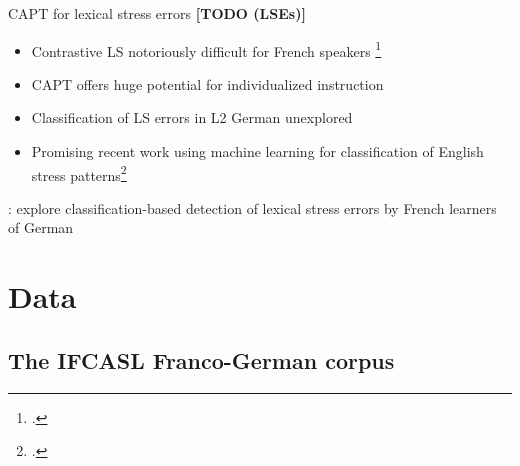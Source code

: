 \documentclass[xcolor={dvipsnames}]{beamer}
\newcommand{\TODO}[1]{{\color{red}\textbf{[TODO #1]}}}
\begin{document}
\begin{frame}{CAPT for lexical stress errors \TODO{(LSEs)}}
\begin{itemize}
\item{Contrastive LS notoriously difficult for French speakers%
\footcite{Dupoux1997}
}
\item{CAPT offers huge potential for individualized instruction}
\vfill
\item{Classification of LS errors in L2 German unexplored}
\item{Promising recent work using machine learning for classification of English stress patterns\footcite{Kim2011,Shahin2012a}
}
\end{itemize}
\vfill
{}: explore classification-based detection of lexical stress errors by French learners of German
\end{frame}


\section{Data}
\subsection{The IFCASL Franco-German corpus}
\end{document}
